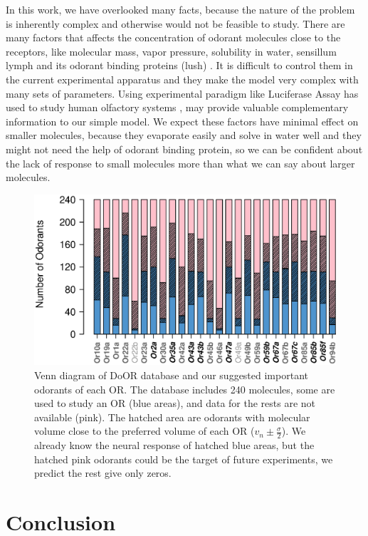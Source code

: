 \documentclass[11pt]{paper} %
\begin{document}
In this work, we have overlooked many facts, 
because the nature of the problem is inherently complex and otherwise would not be feasible to study. 
There are many factors that affects the concentration of odorant molecules close to the receptors, 
like molecular mass, vapor pressure, solubility in water, sensillum lymph and its odorant binding proteins (lush) \cite{xu2005drosophila,gomez2013ligands}. 
It is difficult to control them in the current experimental apparatus and they make the model very complex with many sets of parameters. 
Using experimental paradigm like Luciferase Assay has used to study human olfactory systems \cite{mainland2015human}, 
may provide valuable complementary information to our simple model.
We expect these factors have minimal effect on smaller molecules, 
because they evaporate easily and solve in water well and they might not need the help of odorant binding protein, 
so we can be confident about the lack of response to small molecules more than what we can say about larger molecules. 

\begin{figure}
\centering
	\includegraphics[width=\textwidth]{odorant-suggest}
	\caption{Venn diagram of DoOR database and our suggested important odorants of each OR.
			The database includes 240 molecules, 
			some are used to study an OR (blue areas), 
			and data for the rests are not available (pink).
			The hatched area are odorants with molecular volume close to the preferred volume of each OR
			($v_n \pm \frac{\sigma}{2}$).
			We already know the neural response of hatched blue areas, 
			but the hatched pink odorants could be the target of future experiments, we predict the rest give only zeros.
			}
	\label{fig:odorant-suggest}
\end{figure}

\section*{Conclusion}
\end{document}
